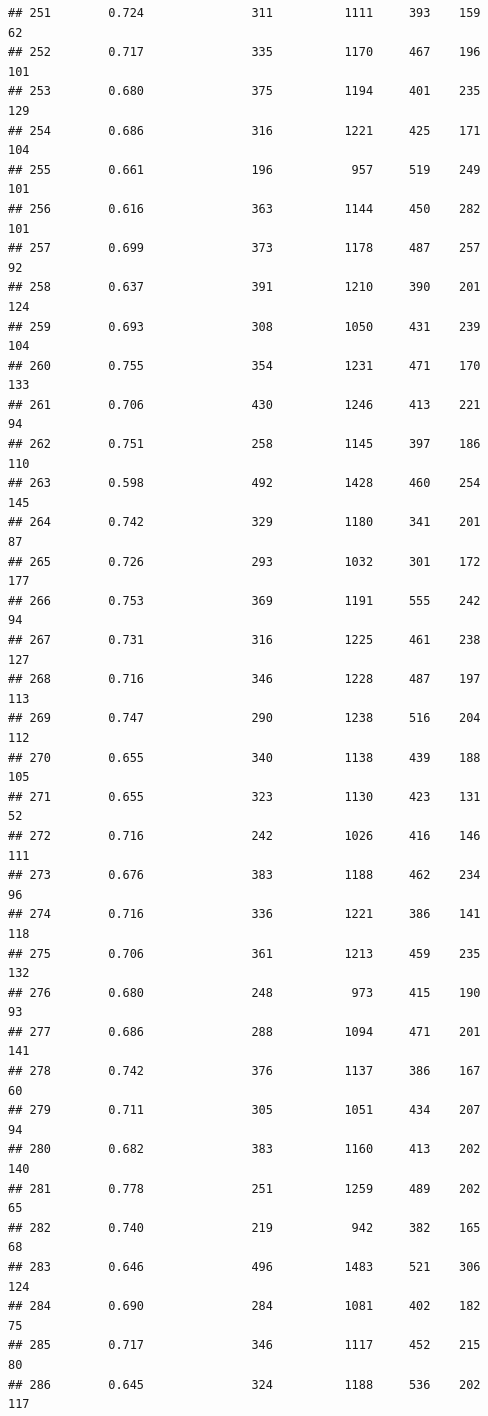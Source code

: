 \documentclass[]{book}
\begin{document}
\begin{verbatim}
## 251        0.724               311          1111     393    159     62
## 252        0.717               335          1170     467    196    101
## 253        0.680               375          1194     401    235    129
## 254        0.686               316          1221     425    171    104
## 255        0.661               196           957     519    249    101
## 256        0.616               363          1144     450    282    101
## 257        0.699               373          1178     487    257     92
## 258        0.637               391          1210     390    201    124
## 259        0.693               308          1050     431    239    104
## 260        0.755               354          1231     471    170    133
## 261        0.706               430          1246     413    221     94
## 262        0.751               258          1145     397    186    110
## 263        0.598               492          1428     460    254    145
## 264        0.742               329          1180     341    201     87
## 265        0.726               293          1032     301    172    177
## 266        0.753               369          1191     555    242     94
## 267        0.731               316          1225     461    238    127
## 268        0.716               346          1228     487    197    113
## 269        0.747               290          1238     516    204    112
## 270        0.655               340          1138     439    188    105
## 271        0.655               323          1130     423    131     52
## 272        0.716               242          1026     416    146    111
## 273        0.676               383          1188     462    234     96
## 274        0.716               336          1221     386    141    118
## 275        0.706               361          1213     459    235    132
## 276        0.680               248           973     415    190     93
## 277        0.686               288          1094     471    201    141
## 278        0.742               376          1137     386    167     60
## 279        0.711               305          1051     434    207     94
## 280        0.682               383          1160     413    202    140
## 281        0.778               251          1259     489    202     65
## 282        0.740               219           942     382    165     68
## 283        0.646               496          1483     521    306    124
## 284        0.690               284          1081     402    182     75
## 285        0.717               346          1117     452    215     80
## 286        0.645               324          1188     536    202    117

\end{verbatim}
\end{document}
